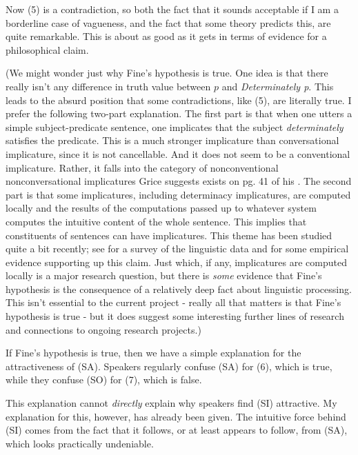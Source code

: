 Now (5) is a contradiction, so both the fact that it sounds acceptable
if I am a borderline case of vagueness, and the fact that some theory
predicts this, are quite remarkable. This is about as good as it gets in
terms of evidence for a philosophical claim.

(We might wonder just why Fine's hypothesis is true. One idea is that
there really isn't any difference in truth value between \(p\) and
\emph{Determinately p}. This leads to the absurd position that some
contradictions, like (5), are literally true. I prefer the following
two-part explanation. The first part is that when one utters a simple
subject-predicate sentence, one implicates that the subject
\emph{determinately} satisfies the predicate. This is a much stronger
implicature than conversational implicature, since it is not
cancellable. And it does not seem to be a conventional implicature.
Rather, it falls into the category of nonconventional nonconversational
implicatures Grice suggests exists on pg. 41 of his
\citeyear{Grice1989}. The second part is that some implicatures,
including determinacy implicatures, are computed locally and the results
of the computations passed up to whatever system computes the intuitive
content of the whole sentence. This implies that constituents of
sentences can have implicatures. This theme has been studied quite a bit
recently; see \citet{Levinson2000} for a survey of the linguistic data
and \citet{Sedivy1999} for some empirical evidence supporting up this
claim. Just which, if any, implicatures are computed locally is a major
research question, but there is \emph{some} evidence that Fine's
hypothesis is the consequence of a relatively deep fact about linguistic
processing. This isn't essential to the current project - really all
that matters is that Fine's hypothesis is true - but it does suggest
some interesting further lines of research and connections to ongoing
research projects.)

If Fine's hypothesis is true, then we have a simple explanation for the
attractiveness of (SA). Speakers regularly confuse (SA) for (6), which
is true, while they confuse (SO) for (7), which is false.

This explanation cannot \emph{directly} explain why speakers find (SI)
attractive. My explanation for this, however, has already been given.
The intuitive force behind (SI) comes from the fact that it follows, or
at least appears to follow, from (SA), which looks practically
undeniable.

